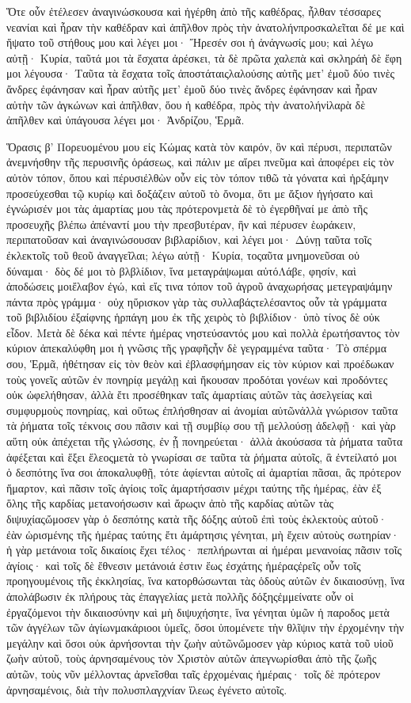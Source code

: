 Ὅτε οὖν ἐτέλεσεν ἀναγινώσκουσα καὶ ἠγέρθη ἀπὸ τῆς καθέδρας, ἦλθαν τέσσαρες νεανίαι καὶ ἦραν τὴν καθέδραν καὶ ἀπῆλθον πρὸς τὴν ἀνατολήνπροσκαλεῖται δέ με καὶ ἥψατο τοῦ στήθους μου καὶ λέγει μοι· Ἤρεσέν σοι ἡ ἀνάγνωσίς μου; καὶ λέγω αὐτῇ· Κυρία, ταῦτά μοι τὰ ἔσχατα ἀρέσκει, τὰ δὲ πρῶτα χαλεπὰ καὶ σκληράἡ δὲ ἔφη μοι λέγουσα· Ταῦτα τὰ ἔσχατα τοῖς ἀποστάταιςλαλούσης αὐτῆς μετ’ ἐμοῦ δύο τινὲς ἄνδρες ἐφάνησαν καὶ ἦραν αὐτῆς μετ’ ἐμοῦ δύο τινὲς ἄνδρες ἐφάνησαν καὶ ἦραν αὐτὴν τῶν ἀγκώνων καὶ ἀπῆλθαν, ὅου ἡ καθέδρα, πρὸς τὴν ἀνατολήνἱλαρὰ δὲ ἀπῆλθεν καὶ ὑπάγουσα λέγει μοι· Ἀνδρίζου, Ἑρμᾶ.

Ὅρασις β’
Πορευομένου μου εἰς Κώμας κατὰ τὸν καιρόν, ὃν καὶ πέρυσι, περιπατῶν ἀνεμνήσθην τῆς περυσινῆς ὁράσεως, καὶ πάλιν με αἵρει πνεῦμα καὶ ἀποφέρει εἰς τὸν αὐτὸν τόπον, ὅπου καὶ πέρυσιἐλθὼν οὖν εἰς τὸν τόπον τιθῶ τὰ γόνατα καὶ ἠρξάμην προσεύχεσθαι τῷ κυρίῳ καὶ δοξάζειν αὐτοῦ τὸ ὄνομα, ὅτι με ἄξιον ἡγήσατο καὶ ἐγνώρισέν μοι τὰς ἁμαρτίας μου τὰς πρότερονμετὰ δὲ τὸ ἐγερθῆναί με ἀπὸ τῆς προσευχῆς βλέπω ἀπέναντί μου τὴν πρεσβυτέραν, ἣν καὶ πέρυσεν ἑωράκειν, περιπατοῦσαν καὶ ἀναγινώσουσαν βιβλαρίδιον, καὶ λέγει μοι· Δύνῃ ταῦτα τοῖς ἐκλεκτοῖς τοῦ θεοῦ ἀναγγεῖλαι; λέγω αὐτῇ· Κυρία, τοςαῦτα μνημονεῦσαι οὐ δύναμαι· δὸς δέ μοι τὸ βλβλίδιον, ἵνα μεταγράψωμαι αὐτόΛάβε, φησίν, καὶ ἀποδώσεις μοιἔλαβον ἐγώ, καὶ εἴς τινα τόπον τοῦ ἀγροῦ ἀναχωρήσας μετεγραψάμην πάντα πρὸς γράμμα· οὐχ ηὕρισκον γὰρ τὰς συλλαβάςτελέσαντος οὖν τὰ γράμματα τοῦ βιβλιδίου ἐξαίφνης ἡρπάγη μου ἐκ τῆς χειρὸς τὸ βιβλίδιον· ὑπὸ τίνος δὲ οὐκ εἶδον.
Μετὰ δὲ δέκα καὶ πέντε ἡμέρας νηστεύσαντός μου καὶ πολλὰ ἐρωτήσαντος τὸν κύριον ἀπεκαλύφθη μοι ἡ γνῶσις τῆς γραφῆςἦν δὲ γεγραμμένα ταῦτα· Τὸ σπέρμα σου, Ἑρμᾶ, ἠθέτησαν εἰς τὸν θεὸν καὶ ἐβλασφήμησαν εἰς τὸν κύριον καὶ προέδωκαν τοὺς γονεῖς αὐτῶν ἐν πονηρίᾳ μεγάλῃ καὶ ἤκουσαν προδόται γονέων καὶ προδόντες οὐκ ὠφελήθησαν, ἀλλὰ ἔτι προσέθηκαν ταῖς ἁμαρτίαις αὐτῶν τὰς ἀσελγείας καὶ συμφυρμοὺς πονηρίας, καὶ οὕτως ἐπλήσθησαν αἱ ἀνομίαι αὐτῶνἀλλὰ γνώρισον ταῦτα τὰ ῥήματα τοῖς τέκνοις σου πᾶσιν καὶ τῇ συμβίῳ σου τῇ μελλούσῃ ἀδελφῇ· καὶ γὰρ αὕτη οὐκ ἀπέχεται τῆς γλώσσης, ἐν ᾗ πονηρεύεται· ἀλλὰ ἀκούσασα τὰ ῥήματα ταῦτα ἀφέξεται καὶ ἕξει ἔλεοςμετὰ τὸ γνωρίσαι σε ταῦτα τὰ ῥήματα αὐτοῖς, ἃ ἐντείλατό μοι ὁ δεσπότης ἵνα σοι ἀποκαλυφθῇ, τότε ἀφίενται αὐτοῖς αἱ ἁμαρτίαι πᾶσαι, ἃς πρότερον ἥμαρτον, καὶ πᾶσιν τοῖς ἁγίοις τοῖς ἁμαρτήσασιν μέχρι ταύτης τῆς ἡμέρας, ἐὰν ἐξ ὅλης τῆς καρδίας μετανοήσωσιν καὶ ἄρωςιν ἀπὸ τῆς καρδίας αὐτῶν τὰς διψυχίαςὤμοσεν γὰρ ὁ δεσπότης κατὰ τῆς δόξης αὐτοῦ ἐπὶ τοὺς ἐκλεκτοὺς αὐτοῦ· ἐὰν ὡρισμένης τῆς ἡμέρας ταύτης ἔτι ἁμάρτησις γένηται, μὴ ἔχειν αὐτοὺς σωτηρίαν· ἡ γὰρ μετάνοια τοῖς δικαίοις ἔχει τέλος· πεπλήρωνται αἱ ἡμέραι μενανοίας πᾶσιν τοῖς ἁγίοις· καὶ τοῖς δὲ ἔθνεσιν μετάνοιά ἐστιν ἕως ἐσχάτης ἡμέραςἐρεῖς οὖν τοῖς προηγουμένοις τῆς ἐκκλησίας, ἵνα κατορθώσωνται τὰς ὁδοὺς αὐτῶν ἐν δικαιοσύνῃ, ἵνα ἀπολάβωσιν ἐκ πλήρους τὰς ἐπαγγελίας μετὰ πολλῆς δόξηςἐμμείνατε οὖν οἱ ἐργαζόμενοι τὴν δικαιοσύνην καὶ μὴ διψυχήσητε, ἵνα γένηται ὑμῶν ἡ παροδος μετὰ τῶν ἀγγέλων τῶν ἁγίωνμακάριοοι ὑμεῖς, ὅσοι ὑπομένετε τὴν θλῖψιν τὴν ἐρχομένην τὴν μεγάλην καὶ ὅσοι οὐκ ἀρνήσονται τὴν ζωὴν αὐτῶνὤμοσεν γὰρ κύριος κατὰ τοῦ υἱοῦ ζωὴν αὐτοῦ, τοὺς ἀρνησαμένους τὸν Χριστὸν αὐτῶν ἀπεγνωρίσθαι ἀπὸ τῆς ζωῆς αὐτῶν, τοὺς νῦν μέλλοντας ἀρνεῖσθαι ταῖς ἐρχομέναις ἡμέραις· τοῖς δὲ πρότερον ἀρνησαμένοις, διὰ τὴν πολυσπλαγχνίαν ἵλεως ἐγένετο αὐτοῖς.
